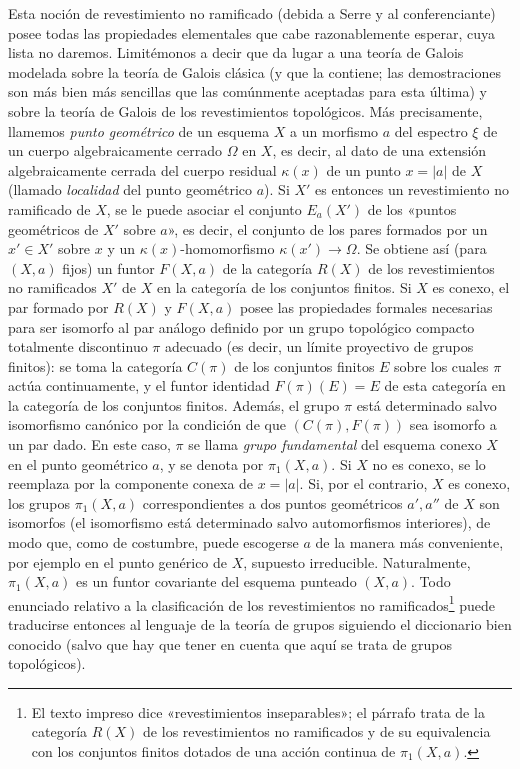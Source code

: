 \documentclass[11pt,twoside,openany]{book}
\numberwithin{equation}{section}
\newcommand{\src}[1]{%
  \phantomsection\hypertarget{src:#1}{}%
  \marginpar{\raggedleft\footnotesize\sffamily #1}%
}
\theoremstyle{plain}
\theoremstyle{definition}
\theoremstyle{remark}
\newcommand{\FgaUnitKey}{frontmatter}
\renewcommand{\src}[1]{%
  \phantomsection\hypertarget{src:\FgaUnitKey:#1}{}%
  \marginpar{\raggedleft\footnotesize\sffamily #1}%
}
\theoremstyle{plain}
\theoremstyle{definition}
\theoremstyle{remark}
\begin{document}
\src{210}
Esta noción de revestimiento no ramificado (debida a Serre y al conferenciante)
posee todas las propiedades elementales que cabe razonablemente esperar, cuya
lista no daremos. Limitémonos a decir que da lugar a una teoría de Galois
modelada sobre la teoría de Galois clásica (y que la contiene; las
demostraciones son más bien más sencillas que las comúnmente aceptadas para
esta última) y sobre la teoría de Galois de los revestimientos topológicos. Más
precisamente, llamemos \emph{punto geométrico} de un esquema $X$ a un morfismo
$a$ del espectro $\xi$ de un cuerpo algebraicamente cerrado $\Omega$ en $X$, es
decir, al dato de una extensión algebraicamente cerrada del cuerpo residual
$\kappa(x)$ de un punto $x=|a|$ de $X$ (llamado \emph{localidad} del punto
geométrico $a$). Si $X'$ es entonces un revestimiento no ramificado de $X$, se
le puede asociar el conjunto $E_a(X')$ de los «puntos geométricos de $X'$ sobre
$a$», es decir, el conjunto de los pares formados por un $x'\in X'$ sobre $x$
y un $\kappa(x)$-homomorfismo $\kappa(x')\longrightarrow\Omega$. Se obtiene así
(para $(X,a)$ fijos) un funtor $F(X,a)$ de la categoría $R(X)$ de los
revestimientos no ramificados $X'$ de $X$ en la categoría de los conjuntos
finitos. Si $X$ es conexo, el par formado por $R(X)$ y $F(X,a)$ posee las
propiedades formales necesarias para ser isomorfo al par análogo definido por
un grupo topológico compacto totalmente discontinuo $\pi$ adecuado (es decir,
un límite proyectivo de grupos finitos): se toma la categoría $C(\pi)$ de los
conjuntos finitos $E$ sobre los cuales $\pi$ actúa continuamente, y el funtor
identidad $F(\pi)(E)=E$ de esta categoría en la categoría de los conjuntos
finitos. Además, el grupo $\pi$ está determinado salvo isomorfismo canónico por
la condición de que $(C(\pi),F(\pi))$ sea isomorfo a un par dado. En este caso,
$\pi$ se llama \emph{grupo fundamental} del esquema conexo $X$ en el punto
geométrico $a$, y se denota por $\pi_1(X,a)$. Si $X$ no es conexo, se lo
reemplaza por la componente conexa de $x=|a|$. Si, por el contrario, $X$ es
conexo, los grupos $\pi_1(X,a)$ correspondientes a dos puntos geométricos
$a',a''$ de $X$ son isomorfos (el isomorfismo está determinado salvo
automorfismos interiores), de modo que, como de costumbre, puede escogerse $a$
de la manera más conveniente, por ejemplo en el punto genérico de $X$, supuesto
irreducible. Naturalmente, $\pi_1(X,a)$ es un funtor covariante del esquema
punteado $(X,a)$. Todo enunciado relativo a la clasificación de los
revestimientos no ramificados\footnote{El texto impreso dice «revestimientos
inseparables»; el párrafo trata de la categoría $R(X)$ de los revestimientos no
ramificados y de su equivalencia con los conjuntos finitos dotados de una acción
continua de $\pi_1(X,a)$.} puede traducirse entonces al lenguaje de la teoría de
grupos siguiendo el diccionario bien conocido (salvo que hay que tener en cuenta
que aquí se trata de grupos topológicos).
\end{document}
